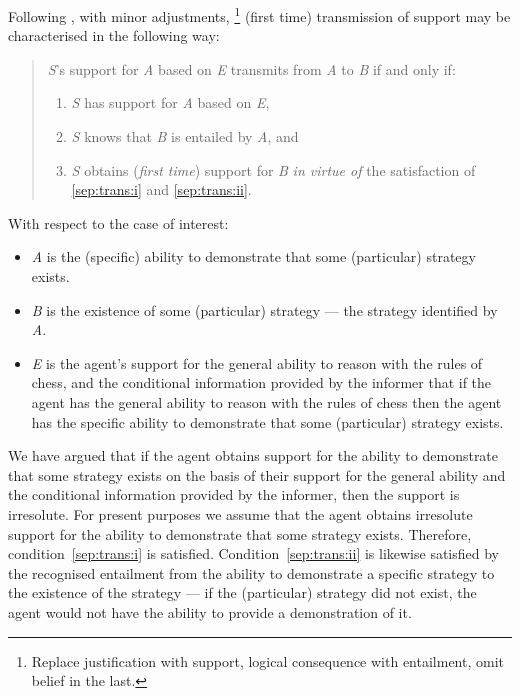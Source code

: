 \documentclass[10pt]{article}
\begin{document}
\begin{note}
  Following \cite{Moretti:2018we}, with minor adjustments,\nolinebreak
  \footnote{
    Replace justification with support, logical consequence with entailment, omit belief in the last.
  }
  (first time) transmission of support may be characterised in the following way:
  \begin{quote}
    \emph{S}'s support for \emph{A} based on \emph{E} transmits from \emph{A} to \emph{B} if and only if:
    \begin{enumerate}[label=(\roman*), ref=(\roman*)]
    \item\label{sep:trans:i} \emph{S} has support for \emph{A} based on \emph{E},
    \item\label{sep:trans:ii} \emph{S} knows that \emph{B} is entailed by \emph{A}, and
    \item\label{sep:trans:iii} \emph{S} obtains (\emph{first time}) support for \emph{B} \emph{in virtue of} the satisfaction of \ref{sep:trans:i} and \ref{sep:trans:ii}.
    \end{enumerate}
  \end{quote}
  With respect to the case of interest:
  \begin{itemize}
  \item \emph{A} is the (specific) ability to demonstrate that some (particular) strategy exists.
  \item \emph{B} is the existence of some (particular) strategy --- the strategy identified by \emph{A}.
  \item \emph{E} is the agent's support for the general ability to reason with the rules of chess, and the conditional information provided by the informer that if the agent has the general ability to reason with the rules of chess then the agent has the specific ability to demonstrate that some (particular) strategy exists.
  \end{itemize}
  We have argued that if the agent obtains support for the ability to demonstrate that some strategy exists on the basis of their support for the general ability and the conditional information provided by the informer, then the support is irresolute.
  For present purposes we assume that the agent obtains irresolute support for the ability to demonstrate that some strategy exists.
  Therefore, condition~\ref{sep:trans:i} is satisfied.
  Condition~\ref{sep:trans:ii} is likewise satisfied by the recognised entailment from the ability to demonstrate a specific strategy to the existence of the strategy --- if the (particular) strategy did not exist, the agent would not have the ability to provide a demonstration of it.


\end{note}
\end{document}
